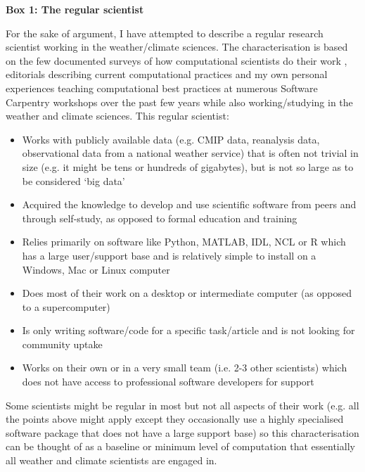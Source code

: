 \textbf{Box 1: The regular scientist}

For the sake of argument, I have attempted to describe a regular research scientist working in the weather/climate sciences. The characterisation is based on the few documented surveys of how computational scientists do their work \citep{Hannay2009,Stodden2010}, editorials describing current computational practices \citep[e.g.][]{Easterbrook2014} and my own personal experiences teaching computational best practices at numerous Software Carpentry \citep{Wilson2014} workshops over the past few years while also working/studying in the weather and climate sciences. This regular scientist:
\begin{itemize}
\item Works with publicly available data (e.g. CMIP data, reanalysis data, observational data from a national weather service) that is often not trivial in size (e.g. it might be tens or hundreds of gigabytes), but is not so large as to be considered `big data' 
\item Acquired the knowledge to develop and use scientific software from peers and through self-study, as opposed to formal education and training
\item Relies primarily on software like Python, MATLAB, IDL, NCL or R which has a large user/support base and is relatively simple to install on a Windows, Mac or Linux computer
\item Does most of their work on a desktop or intermediate computer (as opposed to a supercomputer)
\item Is only writing software/code for a specific task/article and is not looking for community uptake  
\item Works on their own or in a very small team (i.e. 2-3 other scientists) which does not have access to professional software developers for support
\end{itemize}

Some scientists might be regular in most but not all aspects of their work (e.g. all the points above might apply except they occasionally use a highly specialised software package that does not have a large support base) so this characterisation can be thought of as a baseline or minimum level of computation that essentially all weather and climate scientists are engaged in.  








